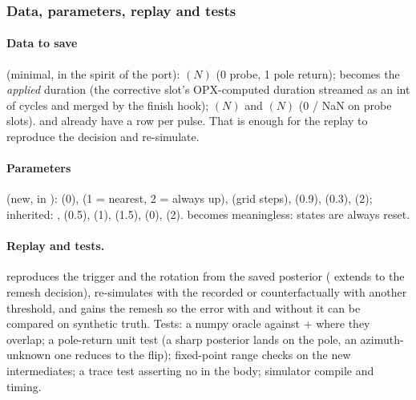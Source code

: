 \subsubsection{Data, parameters, replay and tests}

\paragraph{Data to save} (minimal, in the spirit of the port): 
$(N)$ (0 probe, 1 pole return);  becomes the
\emph{applied} duration (the corrective slot's OPX-computed duration streamed
as an int of cycles and merged by the finish hook); 
$(N)$ and  $(N)$ (0 / NaN on probe slots).
 and  already have a row per
pulse. That is enough for the replay to reproduce the decision and
re-simulate.

\paragraph{Parameters} (new, in ):
 (0),  (1 = nearest, 2 = always
up),  (grid steps), 
(0.9),  (0.3),  (2);
inherited: , 
(0.5),  (1),
 (1.5),
 (0), 
(2).  becomes meaningless: states are always
reset.

\paragraph{Replay and tests.}  reproduces the trigger
and the rotation from the saved posterior ( extends to
the remesh decision), re-simulates with the recorded  or
counterfactually with another threshold, and
 gains the remesh so the error with and
without it can be compared on synthetic truth. Tests: a numpy oracle against
 +  where they overlap; a
pole-return unit test (a sharp posterior lands on the pole, an
azimuth-unknown one reduces to the flip); fixed-point range checks on the new
intermediates; a trace test asserting no  in the body; simulator
compile and timing.

